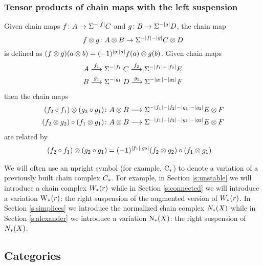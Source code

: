 \subsubsection{Tensor products of chain maps with the left suspension} Given chain maps $f \colon  A\to \Sigma^{-|f|}C$ and $g \colon  B\to \Sigma^{-|g|}D$, the chain map
\[
	f \otimes  g \colon  A \otimes  B\to \Sigma^{-|f|-|g|}C \otimes  D
\]
is defined as $(f \otimes  g)(a \otimes  b) = (-1)^{|g||a|} f(a) \otimes  g(b)$. Given chain maps
\begin{align*}
	A & \overset{f_1}{\longrightarrow} \Sigma^{-|f_1|} C \overset{f_2}{\longrightarrow} \Sigma^{-|f_1|-|f_2|} E \\
	B & \overset{g_1}{\longrightarrow} \Sigma^{-|g_1|} D \overset{g_2}{\longrightarrow} \Sigma^{-|g_1|-|g_2|} F \\
\end{align*}
then the chain maps
\begin{align*}
(f_2\circ f_1) \otimes  (g_2\circ g_1) \colon  &A \otimes  B\longrightarrow \Sigma^{-|f_1|-|f_2|-|g_1|-|g_2|}E \otimes  F
\\
(f_2 \otimes  g_2)\circ (f_1 \otimes  g_1) \colon  &A \otimes  B\longrightarrow \Sigma^{-|f_1|-|f_2|-|g_1|-|g_2|}E \otimes  F
\end{align*}
 are related by
\begin{align*}
	(f_2\circ f_1) \otimes  (g_2\circ g_1) &= (-1)^{|f_1||g_2|}(f_2 \otimes  g_2)\circ (f_1 \otimes  g_1)
\end{align*}
\begin{notation}
	We will often use an upright symbol (for example, $\operatorname{C}_{*}$) to denote a variation of a previously built chain complex $C_{*}$. For example, in Section \ref{s:unstable} we will introduce a chain complex $W_{*}(r)$ while in Section \ref{s:connected} we will introduce a variation $\operatorname{W}_{*}(r)$: the right suspension of the augmented version of $W_{*}(r)$. In Section \ref{s:simplices} we introduce the normalized chain complex $N_{*}(X)$ while in Section \ref{s:alexander} we introduce a variation $\operatorname{N}_{*}(X)$: the right suspension of $N_{*}(X)$.
\end{notation}



\subsection{Categories}\label{s:categories}

